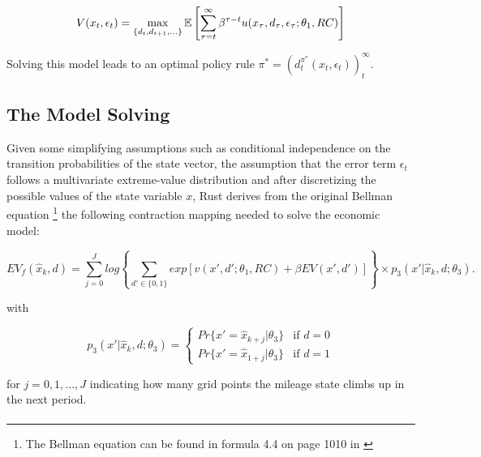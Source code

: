 \begin{equation}
V(x_t, \epsilon_t) = \max_{\{d_t, d_{t+1}, ... \}} \operatorname*{\mathbb{E}} \left[\sum_{\tau=t}^{\infty} \beta^{\tau - t} u(x_\tau, d_\tau, \epsilon_\tau; \theta_1, RC)\right]
\end{equation}

Solving this model leads to an optimal policy rule $\pi^* = (d^{\pi^*}_t(x_t, \epsilon_t))^\infty_t$.

\subsection{The Model Solving}
Given some simplifying assumptions such as conditional independence on the transition probabilities of the state vector, the assumption that the error term $\epsilon_t$ follows a multivariate extreme-value distribution and after discretizing the possible values of the state variable $x$, Rust derives from the original Bellman equation \footnote{The Bellman equation can be found in formula 4.4 on page 1010 in \cite{Rust.1987}} the following contraction mapping needed to solve the economic model:

\begin{equation}
	\label{eq5}
	EV_f(\hat x_k, d) = \sum_{j=0}^{J} log \left\{ \sum_{d'\in\{0, 1\}}  exp[v(x', d'; \theta_1, RC) + \beta EV(x', d')]\right\} \times p_3(x'|\hat x_k, d; \theta_3). 
\end{equation}

with

\[p_3(x'|\hat x_k, d; \theta_3) = \left\{
\begin{array}{lr}
	Pr\{x'=\hat x_{k+j}|\theta_3\}  & \mbox{if } d = 0 \\
	Pr\{x'=\hat x_{1+j}|\theta_3\} & \mbox{if } d = 1
\end{array}
\right.
\]

for $j=0, 1, ..., J$ indicating how many grid points the mileage state climbs up in the next period. \paragraph{}

